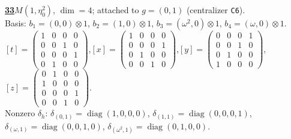 \begin{samepage}\noindent\textbf{\underline{33}}\quad $M(1,\eta^{2}_{0})$, $\dim=4$; attached to $g=(0,1)$ (centralizer \texttt{C6}).\\
Basis: $b_{1}=(0,0)\otimes 1$, $b_{2}=(1,0)\otimes 1$, $b_{3}=(\omega^2,0)\otimes 1$, $b_{4}=(\omega,0)\otimes 1$.\\
$[t]=\left(\begin{smallmatrix} 1 & 0 & 0 & 0 \\ 0 & 0 & 1 & 0 \\ 0 & 0 & 0 & 1 \\ 0 & 1 & 0 & 0 \end{smallmatrix}\right)$,\quad $[x]=\left(\begin{smallmatrix} 1 & 0 & 0 & 0 \\ 0 & 0 & 0 & 1 \\ 0 & 1 & 0 & 0 \\ 0 & 0 & 1 & 0 \end{smallmatrix}\right)$,\quad $[y]=\left(\begin{smallmatrix} 0 & 0 & 0 & 1 \\ 0 & 0 & 1 & 0 \\ 0 & 1 & 0 & 0 \\ 1 & 0 & 0 & 0 \end{smallmatrix}\right)$,\quad $[z]=\left(\begin{smallmatrix} 0 & 1 & 0 & 0 \\ 1 & 0 & 0 & 0 \\ 0 & 0 & 0 & 1 \\ 0 & 0 & 1 & 0 \end{smallmatrix}\right)$.\\
Nonzero $\delta_h$: $\delta_{(0,1)}=\operatorname{diag}(1,0,0,0)$, $\delta_{(1,1)}=\operatorname{diag}(0,0,0,1)$, $\delta_{(\omega,1)}=\operatorname{diag}(0,0,1,0)$, $\delta_{(\omega^2,1)}=\operatorname{diag}(0,1,0,0)$.\end{samepage}
\medskip

